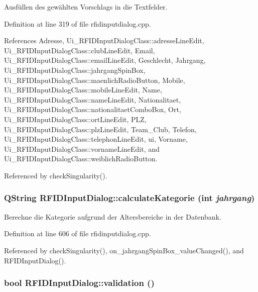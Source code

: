 Ausfüllen des gewählten Vorschlags in die Textfelder. 



Definition at line 319 of file rfidinputdialog.cpp.

References Adresse, Ui\_\-RFIDInputDialogClass::adresseLineEdit, Ui\_\-RFIDInputDialogClass::clubLineEdit, Email, Ui\_\-RFIDInputDialogClass::emailLineEdit, Geschlecht, Jahrgang, Ui\_\-RFIDInputDialogClass::jahrgangSpinBox, Ui\_\-RFIDInputDialogClass::maenlichRadioButton, Mobile, Ui\_\-RFIDInputDialogClass::mobileLineEdit, Name, Ui\_\-RFIDInputDialogClass::nameLineEdit, Nationalitaet, Ui\_\-RFIDInputDialogClass::nationalitaetComboBox, Ort, Ui\_\-RFIDInputDialogClass::ortLineEdit, PLZ, Ui\_\-RFIDInputDialogClass::plzLineEdit, Team\_\-Club, Telefon, Ui\_\-RFIDInputDialogClass::telephonLineEdit, ui, Vorname, Ui\_\-RFIDInputDialogClass::vornameLineEdit, and Ui\_\-RFIDInputDialogClass::weiblichRadioButton.

Referenced by checkSingularity().\hypertarget{class_r_f_i_d_input_dialog_d034adfda34da3b178582a7aa17ae059}{
\subsubsection[calculateKategorie]{\setlength{\rightskip}{0pt plus 5cm}QString RFIDInputDialog::calculateKategorie (int {\em jahrgang})}}
\label{class_r_f_i_d_input_dialog_d034adfda34da3b178582a7aa17ae059}


Berechne die Kategorie aufgrund der Altersbereiche in der Datenbank. 



Definition at line 606 of file rfidinputdialog.cpp.

Referenced by checkSingularity(), on\_\-jahrgangSpinBox\_\-valueChanged(), and RFIDInputDialog().\hypertarget{class_r_f_i_d_input_dialog_ebed3331b476fb984343d6b3cef19a5a}{
\subsubsection[validation]{\setlength{\rightskip}{0pt plus 5cm}bool RFIDInputDialog::validation ()}}
\label{class_r_f_i_d_input_dialog_ebed3331b476fb984343d6b3cef19a5a}


